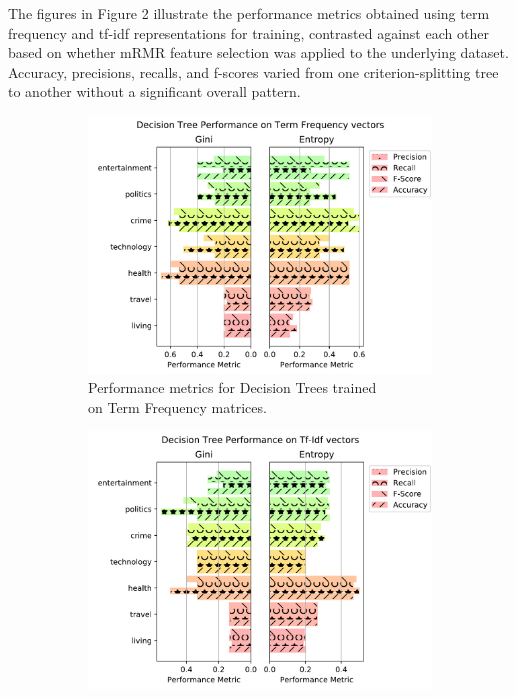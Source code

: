 \documentclass[11pt]{article}
\begin{document}
The figures in Figure 2 illustrate the performance metrics obtained using term frequency and tf-idf representations for training, contrasted against each other based on whether mRMR feature selection was applied to the underlying dataset.
Accuracy, precisions, recalls, and f-scores varied from one criterion-splitting tree to another without a significant overall pattern.

\begin{figure}[h!] \label{fig:perftf_decisiontree}
	\centering
	\begin{subfigure}{.5\textwidth}
	  \centering
	  \includegraphics[width=\linewidth]{figures/decision_tree/tf_prec_n_rec}
	  \caption{Performance metrics for Decision Trees trained \\
	  on Term Frequency matrices.}
	  \label{fig:sub1}
	\end{subfigure}%
	\begin{subfigure}{.5\textwidth}
	  \centering
	  \includegraphics[width=\linewidth]{figures/decision_tree/tfidf_prec_n_rec}

\end{subfigure}
\end{figure}
\end{document}
